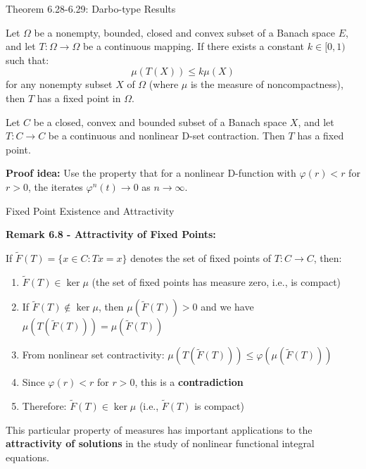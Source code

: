 \documentclass[aspectratio=169,10pt]{beamer}
\begin{document}
\begin{frame}{Theorem 6.28-6.29: Darbo-type Results}

\begin{theorem}
Let $\Omega$ be a nonempty, bounded, closed and convex subset of a Banach space $E$, and let $T: \Omega \to \Omega$ be a continuous mapping. If there exists a constant $k \in [0, 1)$ such that:
\[
\mu(T(X)) \leq k \mu(X)
\]
for any nonempty subset $X$ of $\Omega$ (where $\mu$ is the measure of noncompactness), then $T$ has a fixed point in $\Omega$.
\end{theorem}

\begin{theorem}
Let $C$ be a closed, convex and bounded subset of a Banach space $X$, and let $T: C \to C$ be a continuous and nonlinear D-set contraction. Then $T$ has a fixed point.
\end{theorem}

\textbf{Proof idea:} Use the property that for a nonlinear D-function with $\varphi(r) < r$ for $r > 0$, the iterates $\varphi^n(t) \to 0$ as $n \to \infty$.

\end{frame}

\begin{frame}{Fixed Point Existence and Attractivity}

\textbf{Remark 6.8 - Attractivity of Fixed Points:}

If $\tilde{F}(T) = \{x \in C : Tx = x\}$ denotes the set of fixed points of $T: C \to C$, then:

\begin{enumerate}
    \item $\tilde{F}(T) \in \ker\mu$ (the set of fixed points has measure zero, i.e., is compact)
    \item If $\tilde{F}(T) \notin \ker\mu$, then $\mu(\tilde{F}(T)) > 0$ and we have $\mu(T(\tilde{F}(T))) = \mu(\tilde{F}(T))$
    \item From nonlinear set contractivity: $\mu(T(\tilde{F}(T))) \leq \varphi(\mu(\tilde{F}(T)))$
    \item Since $\varphi(r) < r$ for $r > 0$, this is a \textbf{contradiction}
    \item Therefore: $\tilde{F}(T) \in \ker\mu$ (i.e., $\tilde{F}(T)$ is compact)
\end{enumerate}

\vspace{0.3cm}

This particular property of measures has important applications to the \textbf{attractivity of solutions} in the study of nonlinear functional integral equations.

\end{frame}
\end{document}
